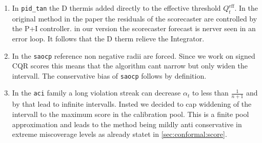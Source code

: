 \begin{enumerate}
  \item In \texttt{pid\_tan} the D thermis added directly to the effective threshold $Q^{\text{eff}}_t$. In the original method in the paper the residuals of the scorecaster are controlled by the P+I controller. in our version the scorecaster forecast is nerver seen in an error loop. It follows that the D therm relieve the Integrator.


   \item In the \texttt{saocp} reference non negative radii are forced. Since we work on signed CQR scores this means that the algorithm cant narrow but only widen the intervall. The conservative bias of \texttt{saocp} follows by definition. 

  \item In the \texttt{aci} family a long violation streak can decrease $\alpha_t$ to less than $\frac{1}{n+1}$ and by that lead to infinite intervalls. Insted we decided to cap widdening of the intervall to the maximum score in the calibration pool. This is a finite pool approximation and leads to the method being mildly anti conservative in extreme miscoverage levels as already statet in \cref{sec:conformal:score}. 


\end{enumerate}
